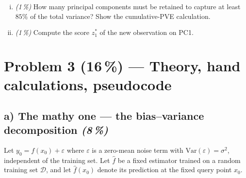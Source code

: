 \documentclass[11pt,a4paper]{article}
\newcommand{\points}[1]{\textbf{(#1\,\%)}}
\newcommand{\subpoints}[1]{\textit{(#1\,\%)}}
\begin{document}
\begin{enumerate}[(i)]
  \item \subpoints{1} How many principal components must be retained to capture at least $85\%$ of the total variance? Show the cumulative-PVE calculation.
  \item \subpoints{1} Compute the score $z^*_1$ of the new observation on PC1.
\end{enumerate}

\vfill\eject

\section*{Problem 3 \points{16} --- Theory, hand calculations, pseudocode}

\subsection*{a) The mathy one --- the bias--variance decomposition \subpoints{8}}

Let $y_0 = f(x_0) + \varepsilon$ where $\varepsilon$ is a zero-mean noise term with $\mathrm{Var}(\varepsilon) = \sigma^2$, independent of the training set. Let $\hat f$ be a fixed estimator trained on a random training set $\mathcal D$, and let $\hat f(x_0)$ denote its prediction at the fixed query point $x_0$.
\end{document}
